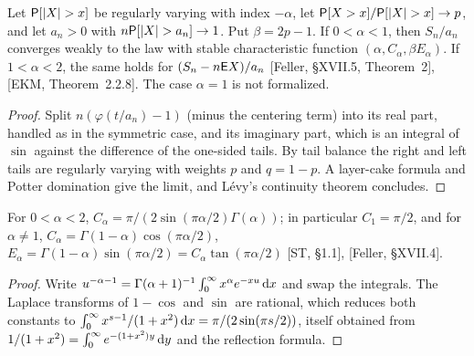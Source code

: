 \begin{theorem}
  \label{thm:gclt-asymmetric}
  \leanok
  Let $\mathsf{P}[|X| > x]$ be regularly varying with index $-\alpha$, let
  $\mathsf{P}[X > x]/\mathsf{P}[|X| > x] \to p$, and let $a_n > 0$ with $n \mathsf{P}[|X| > a_n] \to 1$. Put
  $\beta = 2p - 1$. If $0 < \alpha < 1$, then $S_n / a_n$ converges weakly to the law with stable
  characteristic function $(\alpha, C_\alpha, \beta E_\alpha)$. If $1 < \alpha < 2$, the same
  holds for $(S_n - n \mathsf{E} X)/a_n$ [Feller, \S XVII.5, Theorem~2], [EKM, Theorem~2.2.8]. The case
  $\alpha = 1$ is not formalized.
\end{theorem}
\begin{proof}
  \leanok
  Split $n(\varphi(t/a_n) - 1)$ (minus the centering term) into its real part, handled as in the
  symmetric case, and its imaginary part, which is an integral of $\sin$ against the difference
  of the one-sided tails. By tail balance the right and left tails are regularly varying with
  weights $p$ and $q = 1 - p$. A layer-cake formula and Potter domination give the limit, and
  L\'evy's continuity theorem concludes.
\end{proof}

\begin{theorem}
  \label{thm:stable-constants}
  \leanok
  For $0 < \alpha < 2$, $C_\alpha = \pi / (2 \sin(\pi\alpha/2) \Gamma(\alpha))$; in particular
  $C_1 = \pi/2$, and for $\alpha \ne 1$, $C_\alpha = \Gamma(1-\alpha)\cos(\pi\alpha/2)$,
  $E_\alpha = \Gamma(1-\alpha)\sin(\pi\alpha/2) = C_\alpha \tan(\pi\alpha/2)$ [ST, \S1.1],
  [Feller, \S XVII.4].
\end{theorem}
\begin{proof}
  \leanok
  Write $u^{-\alpha-1} = \Gamma(\alpha+1)^{-1} \int_0^\infty x^\alpha e^{-xu} \, \mathrm{d} x$ and swap the
  integrals. The Laplace transforms of $1 - \cos$ and $\sin$ are rational, which reduces both
  constants to $\int_0^\infty x^{s-1}/(1+x^2) \, \mathrm{d} x = \pi / (2 \sin(\pi s/2))$, itself obtained
  from $1/(1+x^2) = \int_0^\infty e^{-(1+x^2)y} \, \mathrm{d} y$ and the reflection formula.
\end{proof}

